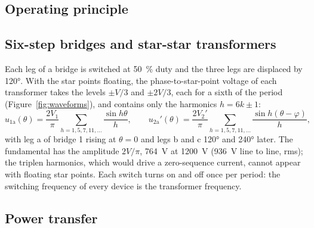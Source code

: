 \documentclass[12pt,a4paper]{scrartcl}
\newcommand{\ped}[1]{_{\mathrm{#1}}}
\begin{document}
\begin{onehalfspace}
\section{Operating principle}
\label{sec:principle}

\subsection{Six-step bridges and star-star transformers}
\label{sec:sixstep}

Each leg of a bridge is switched at \SI{50}{\percent} duty and the three legs are displaced by \ang{120}. With the star points floating, the phase-to-star-point voltage of each transformer takes the levels $\pm V/3$ and $\pm 2V/3$, each for a sixth of the period (Figure~\ref{fig:waveforms}), and contains only the harmonics $h = 6k \pm 1$:
\begin{equation}
	u\ped{1a}(\theta) = \frac{2 V\ped{1}}{\pi} \sum_{h = 1, 5, 7, 11, \ldots} \frac{\sin h\theta}{h}, \qquad
	u\ped{2a}'(\theta) = \frac{2 V\ped{2}'}{\pi} \sum_{h = 1, 5, 7, 11, \ldots} \frac{\sin h(\theta - \varphi)}{h},
	\label{eq:sixstep}
\end{equation}
with leg a of bridge 1 rising at $\theta = 0$ and legs b and c \ang{120} and \ang{240} later. The fundamental has the amplitude $2V/\pi$, \SI{764}{\volt} at \SI{1200}{\volt} (\SI{936}{\volt} line to line, rms); the triplen harmonics, which would drive a zero-sequence current, cannot appear with floating star points. Each switch turns on and off once per period: the switching frequency of every device is the transformer frequency.

\subsection{Power transfer}
\label{sec:power}


\end{onehalfspace}
\end{document}
